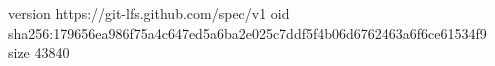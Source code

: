 version https://git-lfs.github.com/spec/v1
oid sha256:179656ea986f75a4c647ed5a6ba2e025c7ddf5f4b06d6762463a6f6ce61534f9
size 43840
